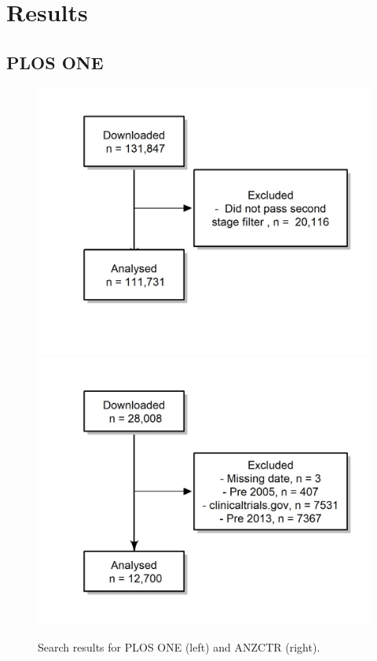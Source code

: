 \documentclass[12pt]{article}
\begin{document}
\hypertarget{results}{%
\section{Results}\label{results}}

\hypertarget{plos-one}{%
\subsection{PLOS ONE}\label{plos-one}}

\begin{figure}

{\centering \includegraphics[width=0.49\linewidth]{figures/excluded_plosone} \includegraphics[width=0.49\linewidth]{figures/excluded_anzctr_missing} 

}

\caption{\label{fig:consort-diagrams}Search results for PLOS ONE (left) and ANZCTR (right).}
\end{figure}
\end{document}
